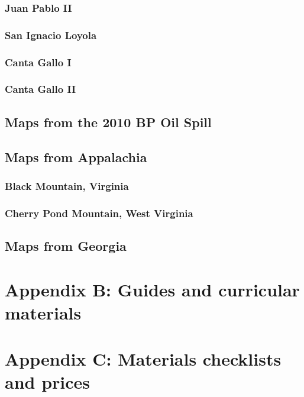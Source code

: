 \documentclass[11pt]{report}
\begin{document}
\subsection{Juan Pablo II}

\subsection{San Ignacio Loyola}

\subsection{Canta Gallo I}

\subsection{Canta Gallo II}

\section{Maps from the 2010 BP Oil Spill}



\section{Maps from Appalachia}

\subsection{Black Mountain, Virginia}

\subsection{Cherry Pond Mountain, West Virginia}

\section{Maps from Georgia}


\chapter*{Appendix B: Guides and curricular materials}


\chapter*{Appendix C: Materials checklists and prices}
\end{document}
